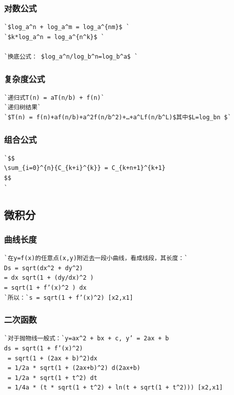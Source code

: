 \documentclass[a4paper]{article}
\begin{document}
\begin{CJK*}{UTF8}{gbsn}
\begin{multicols}{3}
\begin{flushleft}
\subsubsection{对数公式}
\begin{lstlisting}
`$log_a^n + log_a^m = log_a^{nm}$ `
`$k*log_a^n = log_a^{n^k}$ `

`换底公式： $log_a^n/log_b^n=log_b^a$ `
\end{lstlisting}


\subsubsection{复杂度公式}
\begin{lstlisting}
`递归式T(n) = aT(n/b) + f(n)`
`递归树结果`
`$T(n) = f(n)+af(n/b)+a^2f(n/b^2)+…+a^Lf(n/b^L)$其中$L=log_bn $`
\end{lstlisting}

\subsubsection{组合公式}
\begin{lstlisting}
`$$
\sum_{i=0}^{n}{C_{k+i}^{k}} = C_{k+n+1}^{k+1}
$$
`
\end{lstlisting}

\subsection{微积分}

\subsubsection{曲线长度}
\begin{lstlisting}
`在y=f(x)的任意点(x,y)附近去一段小曲线，看成线段，其长度：`
Ds = sqrt(dx^2 + dy^2) 
= dx sqrt(1 + (dy/dx)^2 )
= sqrt(1 + f’(x)^2 ) dx
`所以：`s = sqrt(1 + f’(x)^2) [x2,x1]
\end{lstlisting}

\subsubsection{二次函数}
\begin{lstlisting}
`对于抛物线一般式：`y=ax^2 + bx + c, y’ = 2ax + b
ds = sqrt(1 + f’(x)^2)
 = sqrt(1 + (2ax + b)^2)dx 
 = 1/2a * sqrt(1 + (2ax+b)^2) d(2ax+b)
 = 1/2a * sqrt(1 + t^2) dt
 = 1/4a * (t * sqrt(1 + t^2) + ln(t + sqrt(1 + t^2))) [x2,x1]
\end{lstlisting}


\end{flushleft}
\end{multicols}
\end{CJK*}
\end{document}
